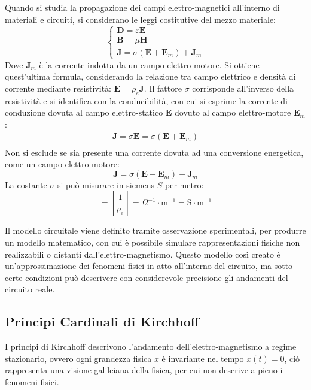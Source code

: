 \documentclass{article}
\newcommand{\vect}[1]{\boldsymbol{\mathbf{#1}}}
\newcommand{\SI}[1]{\mathrm{#1}}
\numberwithin{equation}{subsection}
\begin{document}
Quando si studia la propagazione dei campi elettro-magnetici all'interno di materiali e circuiti, si considerano le leggi costitutive del mezzo materiale:
\begin{equation}
    \begin{cases}
        \vect{D}=\varepsilon\vect{E}\\
        \vect{B}=\mu\vect{H}\\
        \vect{J}=\sigma(\vect{E}+\vect{E}_m)+\vect{J}_m
    \end{cases}
\end{equation}
Dove $\vect{J}_m$ è la corrente indotta da un campo elettro-motore. Si ottiene quest'ultima formula, considerando la relazione tra campo elettrico e densità di corrente mediante 
resistività: $\vect{E}=\rho_e\vect{J}$. Il fattore $\sigma$ corrisponde all'inverso della resistività e si identifica con la conducibilità, con cui si esprime la corrente di conduzione dovuta al campo elettro-statico 
$\vect{E}$ dovuto al campo elettro-motore $\vect{E}_m$:  
\begin{gather*}
    \vect{J}=\sigma\vect{E}=\sigma(\vect{E}+\vect{E}_m)\\
\end{gather*}
Non si esclude se sia presente una corrente dovuta ad una conversione energetica, come un campo elettro-motore:
\begin{equation*}
    \vect{J}=\sigma(\vect{E}+\vect{E}_m)+\vect{J}_m
\end{equation*}
La costante $\sigma$ si può misurare in siemens $S$ per metro:
\begin{equation*}
    [\sigma]=\displaystyle\left[\frac{1}{\rho_e}\right]=\Omega^{-1}\cdot\SI{m}^{-1}=\SI{S}\cdot\SI{m}^{-1}
\end{equation*}

Il modello circuitale viene definito tramite osservazione sperimentali, per produrre un modello matematico, con cui è possibile simulare rappresentazioni fisiche non realizzabili 
o distanti dall'elettro-magnetismo. Questo modello così creato è un'approssimazione dei fenomeni fisici in atto all'interno del circuito, ma sotto certe condizioni può 
descrivere con considerevole precisione gli andamenti del circuito reale. 

\subsection{Principi Cardinali di Kirchhoff}

I principi di Kirchhoff descrivono l'andamento dell'elettro-magnetismo a regime stazionario, ovvero ogni grandezza fisica $x$ è invariante nel tempo
$\dot x(t)=0$, ciò rappresenta una visione galileiana della fisica, per cui non descrive a pieno i fenomeni fisici. 
\end{document}
